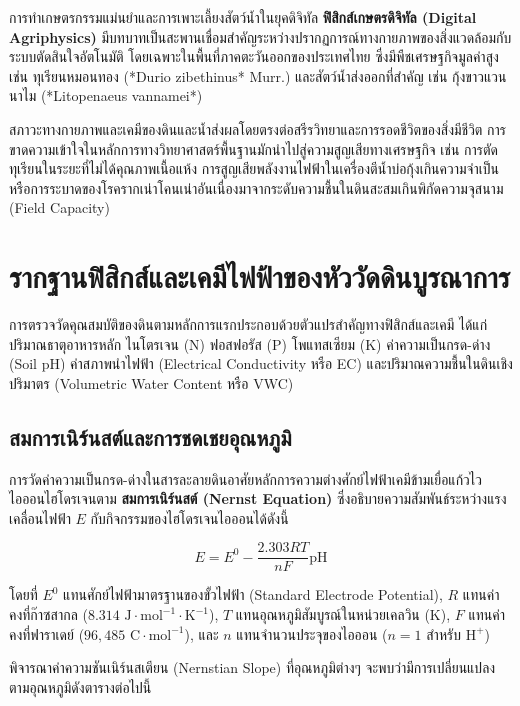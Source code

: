 การทำเกษตรกรรมแม่นยำและการเพาะเลี้ยงสัตว์น้ำในยุคดิจิทัล \textbf{ฟิสิกส์เกษตรดิจิทัล (Digital Agriphysics)} มีบทบาทเป็นสะพานเชื่อมสำคัญระหว่างปรากฏการณ์ทางกายภาพของสิ่งแวดล้อมกับระบบตัดสินใจอัตโนมัติ โดยเฉพาะในพื้นที่ภาคตะวันออกของประเทศไทย ซึ่งมีพืชเศรษฐกิจมูลค่าสูง เช่น ทุเรียนหมอนทอง (*Durio zibethinus* Murr.) และสัตว์น้ำส่งออกที่สำคัญ เช่น กุ้งขาวแวนนาไม (*Litopenaeus vannamei*) 

สภาวะทางกายภาพและเคมีของดินและน้ำส่งผลโดยตรงต่อสรีรวิทยาและการรอดชีวิตของสิ่งมีชีวิต การขาดความเข้าใจในหลักการทางวิทยาศาสตร์พื้นฐานมักนำไปสู่ความสูญเสียทางเศรษฐกิจ เช่น การตัดทุเรียนในระยะที่ไม่ได้คุณภาพเนื้อแห้ง การสูญเสียพลังงานไฟฟ้าในเครื่องตีน้ำบ่อกุ้งเกินความจำเป็น หรือการระบาดของโรครากเน่าโคนเน่าอันเนื่องมาจากระดับความชื้นในดินสะสมเกินพิกัดความจุสนาม (Field Capacity)

\section{รากฐานฟิสิกส์และเคมีไฟฟ้าของหัววัดดินบูรณาการ}

การตรวจวัดคุณสมบัติของดินตามหลักการแรกประกอบด้วยตัวแปรสำคัญทางฟิสิกส์และเคมี ได้แก่ ปริมาณธาตุอาหารหลัก ไนโตรเจน (N) ฟอสฟอรัส (P) โพแทสเซียม (K) ค่าความเป็นกรด-ด่าง (Soil pH) ค่าสภาพนำไฟฟ้า (Electrical Conductivity หรือ EC) และปริมาณความชื้นในดินเชิงปริมาตร (Volumetric Water Content หรือ VWC)

\subsection{สมการเนิร์นสต์และการชดเชยอุณหภูมิ}

การวัดค่าความเป็นกรด-ด่างในสารละลายดินอาศัยหลักการความต่างศักย์ไฟฟ้าเคมีข้ามเยื่อแก้วไวไอออนไฮโดรเจนตาม \textbf{สมการเนิร์นสต์ (Nernst Equation)} ซึ่งอธิบายความสัมพันธ์ระหว่างแรงเคลื่อนไฟฟ้า $E$ กับกิจกรรมของไฮโดรเจนไอออนได้ดังนี้

\begin{equation}
E = E^0 - \frac{2.303 R T}{n F} \text{pH}
\label{eq:nernst}
\end{equation}

โดยที่ $E^0$ แทนศักย์ไฟฟ้ามาตรฐานของขั้วไฟฟ้า (Standard Electrode Potential), $R$ แทนค่าคงที่ก๊าซสากล ($8.314\text{ J}\cdot\text{mol}^{-1}\cdot\text{K}^{-1}$), $T$ แทนอุณหภูมิสัมบูรณ์ในหน่วยเคลวิน (K), $F$ แทนค่าคงที่ฟาราเดย์ ($96,485\text{ C}\cdot\text{mol}^{-1}$), และ $n$ แทนจำนวนประจุของไอออน ($n=1$ สำหรับ $\text{H}^+$)

พิจารณาค่าความชันเนิร์นสเตียน (Nernstian Slope) ที่อุณหภูมิต่างๆ จะพบว่ามีการเปลี่ยนแปลงตามอุณหภูมิดังตารางต่อไปนี้

